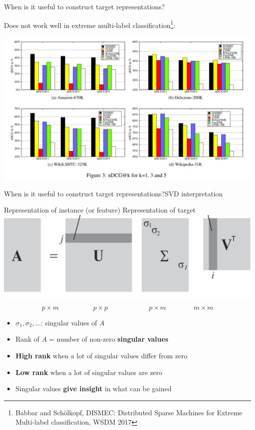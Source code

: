\documentclass[]{beamer}
\renewcommand{\alert}[1]{\textbf{\color{putblue} #1}}
\begin{document}
\begin{frame}{When is it useful to construct target representations?}
\begin{center}
Does not work well in extreme multi-label classification\footnote{Babbar and Sch\"olkopf, DISMEC: Distributed Sparse Machines for Extreme Multi-label classification, WSDM 2017}:

\includegraphics[scale=0.3]{Figures/dismec} 
\end{center}
\end{frame}

\begin{frame}{When is it useful to construct target representations?}{SVD interpretation}
\begin{center}
Representation of instance (or feature) \hspace{1cm} Representation of target
\includegraphics[scale=0.5]{Figures/svd} 
\end{center}
\vspace{-0.3cm}
$$p \times m \qquad \quad \qquad p \times p \qquad \qquad \qquad p \times m \qquad \qquad m \times m$$
\vspace{-0.3cm}
\begin{itemize}
\item $\sigma_1,\sigma_2,...$: singular values of $A$
\item Rank of $A$ = number of non-zero \alert{singular values}
\item \alert{High rank} when a lot of singular values differ from zero
\item \alert{Low rank} when a lot of singular values are zero
\item Singular values \alert{give insight} in what can be gained
\end{itemize}
\end{frame}
\end{document}
